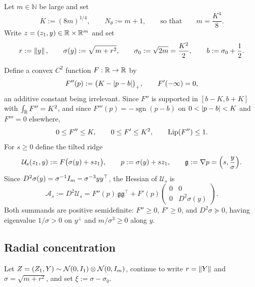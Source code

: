 Let $m\in\mathbb N$ be large and set
\begin{equation}
\label{eq:ridge-K-m}
    K:=(8m)^{1/4},
    \qquad
    N_\theta:=m+1,
    \qquad\text{so that}\qquad
    m=\frac{K^4}8 .
\end{equation}
Write $z=(z_1,y)\in\mathbb{R}\times\mathbb{R}^m$ and set
\begin{equation}
\label{eq:ridge-sigma}
    r:=\left\lVert y\right\rVert,
    \qquad
    \sigma(y):=\sqrt{m+r^2},
    \qquad
    \sigma_0:=\sqrt{2m}=\frac{K^2}2,
    \qquad
    b:=\sigma_0+\frac12 .
\end{equation}

Define a convex $C^2$ function $F:\mathbb{R}\to\mathbb{R}$ by
\begin{equation}
\label{eq:ridge-F}
    F''(p):=\bigl(K-\left\lvert p-b\right\rvert\bigr)_+,
    \qquad F'(-\infty)=0,
\end{equation}
an additive constant being irrelevant. Since $F''$ is supported in $[b-K,b+K]$ with
$\int_{\mathbb{R}} F''=K^2$, and since $F'''(p)=-\operatorname{sgn}(p-b)$ on $0<\left\lvert p-b\right\rvert<K$ and
$F'''=0$ elsewhere,
\begin{equation}
\label{eq:ridge-F-basic}
    0\leq F''\leq K,
    \qquad
    0\leq F'\leq K^2,
    \qquad
    \operatorname{Lip}(F'')\leq1 .
\end{equation}
For $s\geq0$ define the tilted ridge
\begin{equation}
\label{eq:ridge-Us}
    \mathcal U_s(z_1,y):=F\bigl(\sigma(y)+sz_1\bigr),
    \qquad
    p:=\sigma(y)+sz_1,
    \qquad
    \mathfrak g:=\nabla p=\Bigl(s,\frac y\sigma\Bigr).
\end{equation}
Since $D^2\sigma(y)=\sigma^{-1}I_m-\sigma^{-3}yy^\top$, the Hessian of $\mathcal U_s$ is
\begin{equation}
\label{eq:ridge-As}
    \mathcal A_s:=D^2\mathcal U_s
    =F''(p)\,\mathfrak g\mathfrak g^\top
    +F'(p)\begin{pmatrix}0&0\\0&D^2\sigma(y)\end{pmatrix}.
\end{equation}
Both summands are positive semidefinite: $F''\geq0$, $F'\geq0$, and $D^2\sigma\succeq0$, having
eigenvalue $1/\sigma>0$ on $y^\perp$ and $m/\sigma^3\geq0$ along $y$.

\subsection{Radial concentration}

Let $Z=(Z_1,Y)\sim\mathcal{N}(0,I_1)\otimes\mathcal{N}(0,I_m)$, continue to write $r=\left\lVert Y\right\rVert$ and
$\sigma=\sqrt{m+r^2}$, and set $\xi:=\sigma-\sigma_0$.

